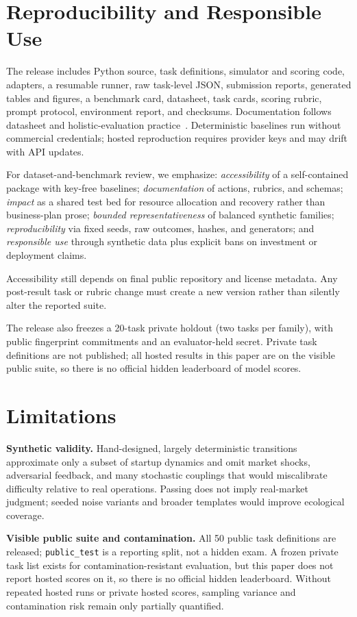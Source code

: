 \documentclass[sigconf,review]{acmart}
\begin{document}
\section{Reproducibility and Responsible Use}
The release includes Python source, task definitions, simulator and scoring code, adapters, a resumable runner, raw task-level JSON, submission reports, generated tables and figures, a benchmark card, datasheet, task cards, scoring rubric, prompt protocol, environment report, and checksums.
Documentation follows datasheet and holistic-evaluation practice~\cite{gebru2021datasheets,liang2023holistic}.
Deterministic baselines run without commercial credentials; hosted reproduction requires provider keys and may drift with API updates.

For dataset-and-benchmark review, we emphasize:
\emph{accessibility} of a self-contained package with key-free baselines;
\emph{documentation} of actions, rubrics, and schemas;
\emph{impact} as a shared test bed for resource allocation and recovery rather than business-plan prose;
\emph{bounded representativeness} of balanced synthetic families;
\emph{reproducibility} via fixed seeds, raw outcomes, hashes, and generators; and
\emph{responsible use} through synthetic data plus explicit bans on investment or deployment claims.

Accessibility still depends on final public repository and license metadata.
Any post-result task or rubric change must create a new version rather than silently alter the reported suite.

The release also freezes a 20-task private holdout (two tasks per family), with public fingerprint commitments and an evaluator-held secret.
Private task definitions are not published; all hosted results in this paper are on the visible public suite, so there is no official hidden leaderboard of model scores.

\section{Limitations}
\textbf{Synthetic validity.}
Hand-designed, largely deterministic transitions approximate only a subset of startup dynamics and omit market shocks, adversarial feedback, and many stochastic couplings that would miscalibrate difficulty relative to real operations.
Passing does not imply real-market judgment; seeded noise variants and broader templates would improve ecological coverage.

\textbf{Visible public suite and contamination.}
All 50 public task definitions are released; \texttt{public\_test} is a reporting split, not a hidden exam.
A frozen private task list exists for contamination-resistant evaluation, but this paper does not report hosted scores on it, so there is no official hidden leaderboard.
Without repeated hosted runs or private hosted scores, sampling variance and contamination risk remain only partially quantified.
\end{document}
